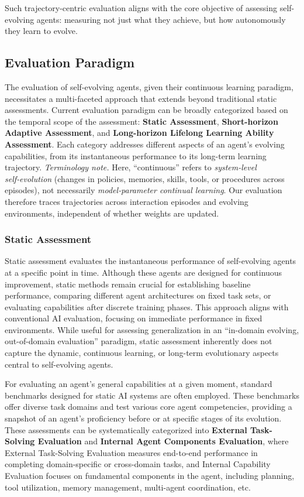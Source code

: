 Such trajectory-centric evaluation aligns with the core objective of assessing self-evolving agents: measuring not just what they achieve, but how autonomously they learn to evolve.





\subsection{Evaluation Paradigm}
The evaluation of self-evolving agents, given their continuous learning paradigm, necessitates a multi-faceted approach that extends beyond traditional static assessments. Current evaluation paradigm can be broadly categorized based on the temporal scope of the assessment: \textbf{Static Assessment}, \textbf{Short-horizon Adaptive Assessment}, and \textbf{Long-horizon Lifelong Learning Ability Assessment}. Each category addresses different aspects of an agent's evolving capabilities, from its instantaneous performance to its long-term learning trajectory. 
\textit{Terminology note.} Here, ``continuous'' refers to \emph{system-level self‑evolution} (changes in policies, memories, skills, tools, or procedures across episodes), not necessarily \emph{model‑parameter continual learning}. Our evaluation therefore traces trajectories across interaction episodes and evolving environments, independent of whether weights are updated.

\subsubsection{Static Assessment}

Static assessment evaluates the instantaneous performance of self-evolving agents at a specific point in time. Although these agents are designed for continuous improvement, static methods remain crucial for establishing baseline performance, comparing different agent architectures on fixed task sets, or evaluating capabilities after discrete training phases. This approach aligns with conventional AI evaluation, focusing on immediate performance in fixed environments. While useful for assessing generalization in an ``in-domain evolving, out-of-domain evaluation'' paradigm, static assessment inherently does not capture the dynamic, continuous learning, or long-term evolutionary aspects central to self-evolving agents.

For evaluating an agent's general capabilities at a given moment, standard benchmarks designed for static AI systems are often employed. These benchmarks offer diverse task domains and test various core agent competencies, providing a snapshot of an agent's proficiency before or at specific stages of its evolution.
These assessments can be systematically categorized into \textbf{External Task-Solving Evaluation} and \textbf{Internal Agent Components Evaluation}, where External Task-Solving Evaluation measures end-to-end performance in completing domain-specific or cross-domain tasks, and Internal Capability Evaluation focuses on fundamental components in the agent, including planning, tool utilization, memory management, multi-agent coordination, etc.

